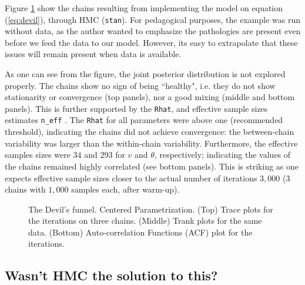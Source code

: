 Figure \ref{fig:devil_CE} show the chains resulting from implementing the model on equation (\ref{eq:devil}), through HMC (\texttt{stan}). For pedagogical purposes, the example was run without data, as the author wanted to emphasize the pathologies are present even before we feed the data to our model. However, its easy to extrapolate that these issues will remain present when data is available.

As one can see from the figure, the joint posterior distribution is not explored properly. The chains show no sign of being ``healthy", i.e. they do not show stationarity or convergence (top panels), nor a good mixing (middle and bottom panels). This is further supported by the \texttt{Rhat}, and effective sample sizes estimates \texttt{n\_eff} \cite{Gelman_et_al_2014}. The \texttt{Rhat} for all parameters were above one (recommended threshold), indicating the chains did not achieve convergence: the between-chain variability was larger than the within-chain variability. Furthermore, the effective samples sizes were $34$ and $293$ for $v$ and $\theta$, respectively; indicating the values of the chains remained highly correlated (see bottom panels). This is striking as one expects effective sample sizes closer to the actual number of iterations $3,000$ ($3$ chains with $1,000$ samples each, after warm-up).
%
\begin{figure}[h]
	\centering
	\begin{subfigure}
		\texttt{[image: 1\_trace\_CE\_simple]}
	\end{subfigure}
	\begin{subfigure}
		\texttt{[image: 1\_trank\_CE\_simple]}
	\end{subfigure}
	\begin{subfigure}
		\texttt{[image: 1\_acf\_CE\_simple]}
	\end{subfigure}
	\caption[The Devil's funnel. Centered Parametrization. Stan.]%
	{The Devil's funnel. Centered Parametrization. (Top) Trace plots for the iterations on three chains. (Middle) Trank plots for the same data. (Bottom) Auto-correlation Functions (ACF) plot for the iterations.}
	\label{fig:devil_CE}
\end{figure}


\subsection{Wasn't HMC the solution to this?}

